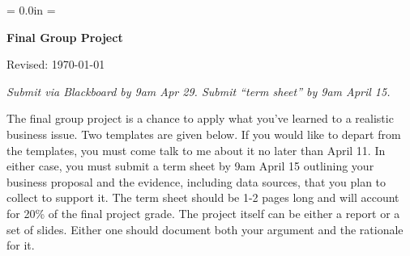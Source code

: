 \documentclass[letterpaper,12pt]{article}
\def\HeadName{Final Group Project}
\begin{document}
\parindent = 0.0in
\parskip = \bigskipamount
\thispagestyle{empty}%
\Head

\centerline{\large \bf \HeadName}%
\centerline{Revised:  \today}

\medskip
{\it Submit via Blackboard by 9am Apr 29.  Submit ``term sheet'' by 9am April 15.}
\medskip

The final group project is a chance to apply what you've learned to 
a realistic business issue.  
Two templates are given below.    
If you would like to depart from the templates, 
you must come talk to me about it no later than April 11.
In either case, {you must submit a term sheet by 
9am April 15\/} outlining your business proposal 
and the evidence, including data sources,
that you plan to collect to support it.  
The term sheet should be 1-2 pages long and 
will account for 20\% of the final project grade.     
The project itself can be either a report or a set of slides.
Either one should document both your argument and the rationale 
for it.  


\end{document}
